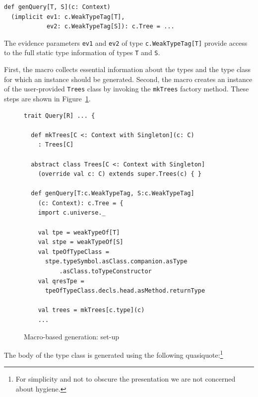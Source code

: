 \documentclass[preprint]{sigplanconf}
\begin{document}
\begin{lstlisting}
def genQuery[T, S](c: Context)
  (implicit ev1: c.WeakTypeTag[T],
            ev2: c.WeakTypeTag[S]): c.Tree = ...
\end{lstlisting}
\noindent
The evidence parameters \verb|ev1| and \verb|ev2| of type \verb|c.WeakTypeTag[T]| provide
access to the full static type information of types \verb|T| and \verb|S|.



First, the macro collects essential information about the types and the type
class for which an instance should be generated. Second, the macro creates an
instance of the user-provided \verb|Trees| class by invoking the
\verb|mkTrees| factory method. These steps are shown in Figure~\ref{fig:macro-set-up}.

\begin{figure}
\centering
\begin{lstlisting}
trait Query[R] ... {

  def mkTrees[C <: Context with Singleton](c: C)
    : Trees[C]

  abstract class Trees[C <: Context with Singleton]
    (override val c: C) extends super.Trees(c) { }

  def genQuery[T:c.WeakTypeTag, S:c.WeakTypeTag]
    (c: Context): c.Tree = {
    import c.universe._

    val tpe = weakTypeOf[T]
    val stpe = weakTypeOf[S]
    val tpeOfTypeClass =
      stpe.typeSymbol.asClass.companion.asType
          .asClass.toTypeConstructor
    val qresTpe =
      tpeOfTypeClass.decls.head.asMethod.returnType

    val trees = mkTrees[c.type](c)
    ...
\end{lstlisting}
  \caption{Macro-based generation: set-up}
  \label{fig:macro-set-up}
\end{figure}

The body of the type class is generated using the following
quasiquote:\footnote{For simplicity and not to obscure the presentation we are
not concerned about hygiene.}
\end{document}

